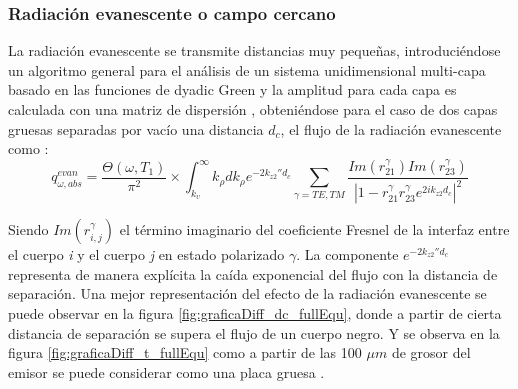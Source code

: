\subsubsection{Radiación evanescente o campo cercano}
La radiación evanescente se transmite distancias muy pequeñas, introduciéndose un algoritmo general para el análisis de un sistema unidimensional multi-capa basado en las funciones de dyadic Green y la amplitud para cada capa es calculada con una matriz de dispersión \cite{nfTPV_fullEquations}, obteniéndose para el caso de dos capas gruesas separadas por vacío una distancia $d_c$, el flujo de la radiación evanescente \cite{nfTPV_equations} como :
\begin{equation}
q_{\omega,abs}^{evan}=\dfrac{\Theta \left( \omega,T_1 \right)}{\pi^2}\times \int^{\infty}_{k_\upsilon}k_\rho d k_\rho e^{-2k_{z2}'' d_c} \sum_{\gamma=TE,TM} \dfrac{Im\left( r_{21}^\gamma \right)Im\left( r_{23}^\gamma \right)}{\left| 1- r_{21}^\gamma r_{23}^\gamma e^{2ik_{z2}d_{c}} \right|^2}
\label{eq:flujoEvasNF}
\end{equation}

Siendo $Im\left(r_{i,j}^\gamma \right)$ el término imaginario del coeficiente Fresnel de la interfaz entre el cuerpo \textit{i} y el cuerpo \textit{j} en estado polarizado $\gamma$. La componente $e^{-2k_{z2}'' d_c}$ representa de manera explícita la caída exponencial del flujo con la distancia de separación. Una mejor representación del efecto de la radiación evanescente se puede observar en la figura \ref{fig:graficaDiff_dc_fullEqu}, donde a partir de cierta distancia de separación se supera el flujo de un cuerpo negro. Y se observa en la figura \ref{fig:graficaDiff_t_fullEqu} como a partir de las 100 $\mu m$ de grosor del emisor se puede considerar como una placa gruesa \cite{nfTPV_fullEquations}.

